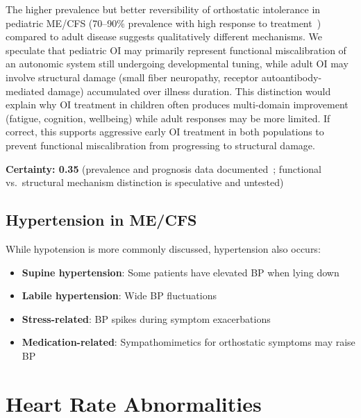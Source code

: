 \begin{speculation}
\label{spec:oi-distinction}
The higher prevalence but better reversibility of orthostatic intolerance in
pediatric ME/CFS (70--90\% prevalence with high response to treatment~\cite{Ojha2024pediatricPOTS,Heine2019pediatricCFS}) compared
to adult disease suggests qualitatively different mechanisms. We speculate that
pediatric OI may primarily represent functional miscalibration of an autonomic
system still undergoing developmental tuning, while adult OI may involve
structural damage (small fiber neuropathy, receptor autoantibody-mediated
damage) accumulated over illness duration. This distinction would explain why
OI treatment in children often produces multi-domain improvement (fatigue,
cognition, wellbeing) while adult responses may be more limited. If correct,
this supports aggressive early OI treatment in both populations to prevent
functional miscalibration from progressing to structural damage.

\textbf{Certainty: 0.35} (prevalence and prognosis data documented~\cite{Ojha2024pediatricPOTS,Heine2019pediatricCFS}; functional vs.\ structural mechanism distinction is speculative and untested)
\end{speculation}

\subsection{Hypertension in ME/CFS}
\label{sec:hypertension}

While hypotension is more commonly discussed, hypertension also occurs:

\begin{itemize}
    \item \textbf{Supine hypertension}: Some patients have elevated BP when lying down
    \item \textbf{Labile hypertension}: Wide BP fluctuations
    \item \textbf{Stress-related}: BP spikes during symptom exacerbations
    \item \textbf{Medication-related}: Sympathomimetics for orthostatic symptoms may raise BP
\end{itemize}

\section{Heart Rate Abnormalities}
\label{sec:heart-rate}

